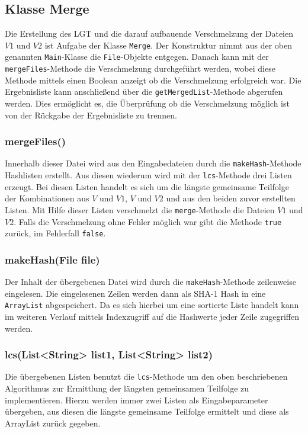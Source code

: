 \documentclass[a4paper,titlepage,12pt]{scrartcl}
\begin{document}
\subsection{Klasse Merge}
\label{sec:classmerge}
Die Erstellung des LGT und die darauf aufbauende Verschmelzung der Dateien $V1$ und $V2$ ist Aufgabe der Klasse \texttt{Merge}. Der Konstruktur nimmt aus der oben genannten \texttt{Main}-Klasse die \texttt{File}-Objekte entgegen. Danach kann mit der \texttt{mergeFiles}-Methode die Verschmelzung durchgeführt werden, wobei diese Methode mittels einen Boolean anzeigt ob die Verschmelzung erfolgreich war. Die Ergebnisliste kann anschließend über die \texttt{getMergedList}-Methode abgerufen werden. Dies ermöglicht es, die Überprüfung ob die Verschmelzung möglich ist von der Rückgabe der Ergebnisliste zu trennen.

\subsubsection{mergeFiles()}
\label{sec:mergefiles}
Innerhalb dieser Datei wird aus den Eingabedateien durch die \texttt{makeHash}-Methode Hashlisten erstellt. Aus diesen wiederum wird mit der \texttt{lcs}-Methode drei Listen erzeugt.
Bei diesen Listen handelt es sich um die längste gemeinsame Teilfolge der Kombinationen aus $V$ und $V1$, $V$ und $V2$ und aus den beiden zuvor erstellten Listen. Mit Hilfe dieser Listen verschmelzt die \texttt{merge}-Methode die Dateien $V1$ und $V2$. Falls die Verschmelzung ohne Fehler möglich war gibt die Methode \texttt{true} zurück, im Fehlerfall \texttt{false}.

\subsubsection{makeHash(File file)}
\label{sec:makehash}
Der Inhalt der übergebenen Datei wird durch die \texttt{makeHash}-Methode zeilenweise eingelesen.
Die eingelesenen Zeilen werden dann als SHA-1 Hash in eine \texttt{ArrayList} abgespeichert. Da es sich hierbei um eine sortierte Liste handelt kann im weiteren Verlauf mittels Indexzugriff auf die Hashwerte jeder Zeile zugegriffen werden.

\subsubsection{lcs(List<String> list1, List<String> list2)}
\label{sec:lcs}
Die übergebenen Listen benutzt die \texttt{lcs}-Methode um den oben beschriebenen Algorithmus zur Ermittlung der längsten gemeinsamen Teilfolge zu implementieren.
Hierzu werden immer zwei Listen als Eingabeparameter übergeben, aus diesen die längste gemeinsame Teilfolge ermittelt und diese als ArrayList zurück gegeben.
\end{document}
